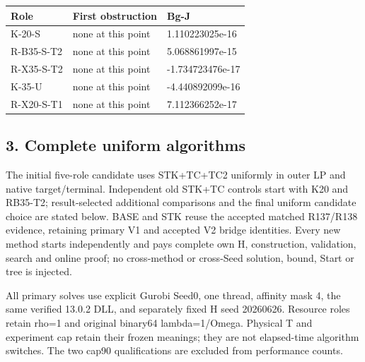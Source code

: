 \documentclass[
  american,
  11pt,
]{article}
\newcounter{none} %
\begin{document}

{\def\LTcaptype{none} %
\begin{longtable}[]{@{}lll@{}}
\toprule\noalign{}
Role & First obstruction & Bg-J \\
\midrule\noalign{}
\endhead
\bottomrule\noalign{}
\endlastfoot
K-20-S & none at this point & 1.110223025e-16 \\
R-B35-S-T2 & none at this point & 5.068861997e-15 \\
R-X35-S-T2 & none at this point & -1.734723476e-17 \\
K-35-U & none at this point & -4.440892099e-16 \\
R-X20-S-T1 & none at this point & 7.112366252e-17 \\
\end{longtable}
}

\subsection{3. Complete uniform
algorithms}\label{complete-uniform-algorithms}

The initial five-role candidate uses STK+TC+TC2 uniformly in outer LP
and native target/terminal. Independent old STK+TC controls start with
K20 and RB35-T2; result-selected additional comparisons and the final
uniform candidate choice are stated below. BASE and STK reuse the
accepted matched R137/R138 evidence, retaining primary V1 and accepted
V2 bridge identities. Every new method starts independently and pays
complete own H, construction, validation, search and online proof; no
cross-method or cross-Seed solution, bound, Start or tree is injected.

All primary solves use explicit Gurobi Seed0, one thread, affinity mask
4, the same verified 13.0.2 DLL, and separately fixed H seed 20260626.
Resource roles retain rho=1 and original binary64 lambda=1/Omega.
Physical T and experiment cap retain their frozen meanings; they are not
elapsed-time algorithm switches. The two cap90 qualifications are
excluded from performance counts.

\end{document}
